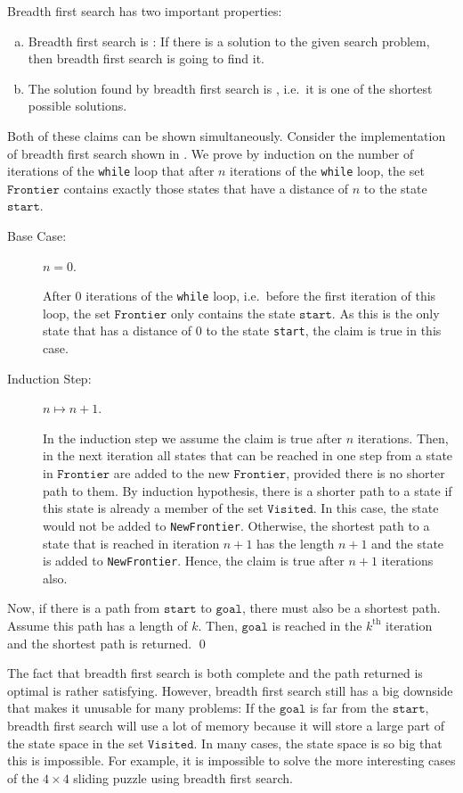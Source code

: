 Breadth first search has two important properties:
\begin{enumerate}[(a)]
\item Breadth first search is :  If there is a solution to the given
      search problem, then breadth first search is going to find it.
\item The solution found by breadth first search is ,  i.e.~it is one of the
      shortest possible solutions.
\end{enumerate}
\proof
Both of these claims can be shown simultaneously.  Consider the implementation of breadth first
search shown in .  We prove by induction on the number of
iterations of the \texttt{while} loop that after $n$ iterations of the \texttt{while} loop,
the set $\texttt{Frontier}$ contains exactly those states that have a distance of $n$ to the state
$\texttt{start}$.
\begin{description}
\item[Base Case:] $n = 0$.

      After $0$ iterations of the \texttt{while} loop, i.e.~before the first iteration of this loop,
      the set $\texttt{Frontier}$ only contains the state $\texttt{start}$.  As this is the only state that has a
      distance of $0$ to the state \texttt{start}, the claim is true in this case.
\item[Induction Step:] $n \mapsto n+1$.

      In the induction step we assume the claim is true after $n$ iterations.  Then, in the next iteration all
      states that can be reached in one step from a state in $\texttt{Frontier}$ are added to the new $\texttt{Frontier}$,
      provided there is no shorter path to them.  By induction hypothesis, there is a shorter path to a state
      if this state is already a member of the set $\texttt{Visited}$.  In this case, the state would not be
      added to \texttt{NewFrontier}.  Otherwise, the shortest path to a state that is
      reached in iteration $n+1$ has the length $n+1$ and the state is added to \texttt{NewFrontier}.  Hence,
      the claim is true after $n+1$ iterations also.
\end{description}
Now, if there is a path from $\texttt{start}$ to $\texttt{goal}$, there must also be a shortest
path.  Assume this path has a length of $k$.  Then, $\texttt{goal}$ is reached in the $k^{\textrm{th}}$
iteration and the shortest path is returned.
\qed

The fact that breadth first search is both complete and the path returned is optimal is rather
satisfying.  However, breadth first search still has a big downside that makes it unusable for
many problems:  If the $\texttt{goal}$ is far from the $\texttt{start}$, breadth first search will use
a lot of memory because it will store a large part of the state space in the set
$\texttt{Visited}$.  In many cases, the state space is so big that this is impossible.  For example, it is
impossible to solve the more interesting cases of the $4 \times 4$ sliding puzzle using breadth first search.

